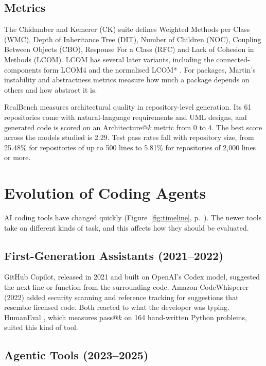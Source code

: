\subsection{Metrics}
\label{sec:architectural-metrics}

The Chidamber and Kemerer (CK) suite \citep{chidamber1994metrics} defines Weighted Methods per Class
(WMC), Depth of Inheritance Tree (DIT), Number of Children (NOC), Coupling Between Objects (CBO),
Response For a Class (RFC) and Lack of Cohesion in Methods (LCOM). LCOM has several later variants,
including the connected-components form LCOM4 \citep{hitz1995cohesion} and the normalised LCOM*
\citep{hendersonsellers1996metrics}. For packages, Martin's instability and abstractness metrics
\citep{martin2003agile} measure how much a package depends on others and how abstract it is.

RealBench \citep{li2026realbench} measures architectural quality in repository-level generation.
Its 61 repositories come with natural-language requirements and UML designs, and generated code is
scored on an Architecture@$k$ metric from 0 to 4. The best score across the models studied is
2.29. Test pass rates fall with repository size, from 25.48\% for repositories of up to 500 lines to
5.81\% for repositories of 2,000 lines or more.

\section{Evolution of Coding Agents}
\label{sec:evolution}

AI coding tools have changed quickly (Figure~\ref{fig:timeline}, p.~\pageref{fig:timeline}). The
newer tools take on different kinds of task, and this affects how they should be evaluated.

\subsection{First-Generation Assistants (2021--2022)}

GitHub Copilot, released in 2021 and built on OpenAI's Codex model, suggested the next line or
function from the surrounding code. Amazon CodeWhisperer (2022) added security scanning and
reference tracking for suggestions that resemble licensed code. Both reacted to what the developer
was typing. HumanEval \citep{chen2021codex}, which measures pass@$k$ on 164 hand-written Python
problems, suited this kind of tool.

\subsection{Agentic Tools (2023--2025)}

